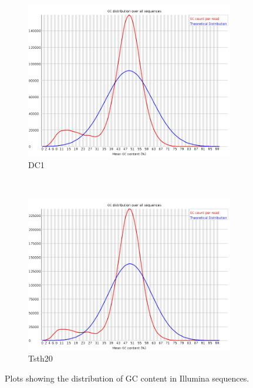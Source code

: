 \begin{figure}
  \centering
  \begin{subfigure}{0.8\textwidth}
    \includegraphics[width=\textwidth]{figures/dc1-low-gc-fastqc.png}
    \caption{DC1}
    \label{fig:dc1fastqc}
  \end{subfigure}
  \\
  \begin{subfigure}{0.8\textwidth}
    \includegraphics[width=\textwidth]{figures/tsth20-low-gc-fastqc.png}
    \caption{Tsth20}
    \label{fig:tsth20fastqc}
  \end{subfigure}
  \caption{Plots showing the distribution of GC content in Illumina
    sequences.}
  \label{fig:fastqc-lowgc}
\end{figure}

